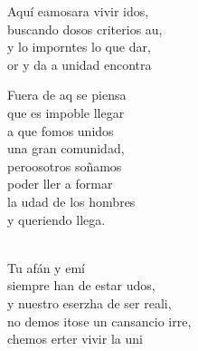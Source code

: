 \documentclass[12pt]{article}
\begin{document}
\begin{multicols*}{2}
\begin{cancion}%
	Aquí eamosara vivir idos,\\
	buscando dosos criterios au,\\
	y lo imporntes lo que dar,\\
	or y da a unidad encontra  \\
	\begin{chorus}%
	Fuera de aq se piensa  \\
	que es impoble llegar\\
	a que fomos unidos \\
una gran comunidad,\\
	peroosotros soñamos \\
	poder ller a formar\\
	la udad de los hombres \\
	y queriendo llega.\\
	\end{chorus}%
	      \\
	Tu afán y emí \\
	siempre han de estar udos, \\
	y nuestro eserzha de ser reali,\\
	no demos itose un cansancio irre,\\
	chemos erter vivir la uni\\
\end{cancion}%


\end{multicols*}
\end{document}
